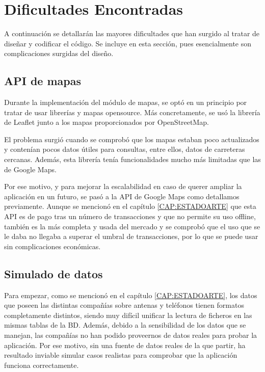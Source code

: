 \section{Dificultades Encontradas\label{SEC:DIFICULTAD}}
  A continuación se detallarán las mayores dificultades que han surgido al tratar de diseñar y codificar el código. Se incluye en esta sección, pues esencialmente son complicaciones surgidas del diseño.
  
  \subsection{API de mapas}
    Durante la implementación del módulo de mapas, se optó en un principio por tratar de usar librerías y mapas opensource. Más concretamente, se usó la librería de Leaflet junto a los mapas proporcionados por OpenStreetMap.
    
    El problema surgió cuando se comprobó que los mapas estaban poco actualizados y contenían pocos datos útiles para consultas, entre ellos, datos de carreteras cercanas. Además, esta librería tenía funcionalidades mucho más limitadas que las de Google Maps.
    
    Por ese motivo, y para mejorar la escalabilidad en caso de querer ampliar la aplicación en un futuro, se pasó a la API de Google Maps como detallamos previamente. 
    Aunque se mencionó en el capítulo \ref{CAP:ESTADOARTE} que esta API es de pago tras un número de transacciones y que no permite su uso offline, también es la más completa y usada del mercado y se comprobó que el uso que se le daba no llegaba a superar el umbral de transacciones, por lo que se puede usar sin complicaciones económicas.
    
    
   \subsection{Simulado de datos}
    Para empezar, como se mencionó en el capítulo \ref{CAP:ESTADOARTE}, los datos que poseen las distintas compañías sobre antenas y teléfonos tienen formatos completamente distintos, siendo muy difícil unificar la lectura de ficheros en las mismas tablas de la BD.
    Además, debido a la sensibilidad de los datos que se manejan, las compañías no han podido proveernos de datos reales para probar la aplicación. 
    Por ese motivo, sin una fuente de datos reales de la que partir, ha resultado inviable simular casos realistas para comprobar que la aplicación funciona correctamente. 
    
